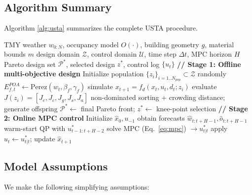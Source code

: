 \documentclass[5p,times,twocolumn]{elsarticle}
\begin{document}
\subsection{Algorithm Summary}

Algorithm \ref{alg:usta} summarizes the complete USTA procedure.

\begin{algorithm}[!t]
\caption{USTA Hierarchical Design-Control Pipeline}
\label{alg:usta}
\small
\begin{algorithmic}[1]
\REQUIRE TMY weather $w_{0:N}$, occupancy model $O(\cdot)$, building geometry $g$, material bounds $m$
\REQUIRE design domain $\mathcal{Z}$, control domain $\mathcal{U}$, time step $\Delta t$, MPC horizon $H$
\ENSURE Pareto design set $\mathcal{P}^*$, selected design $z^*$, control log $\{u_t\}$
\STATE \textbf{// Stage 1: Offline multi-objective design}
\STATE Initialize population $\{z_i\}_{i=1..N_{pop}} \subset \mathcal{Z}$ randomly
        \STATE $E^{POA}_{f,t} \leftarrow \text{Perez}(w_t, \beta_f, \gamma_f)$ 
        \STATE simulate $x_{t+1} = f_d(x_t, u_t, d_t; z_i)$ 
        \STATE evaluate $J(z_i) = [J_e, J_c, J_g, J_s, J_a]$ 
    \ENDFOR
    \STATE non-dominated sorting + crowding distance; generate offspring
\ENDFOR
\STATE $\mathcal{P}^* \leftarrow$ final Pareto front; $z^* \leftarrow$ knee-point selection
\STATE \textbf{// Stage 2: Online MPC control}
\STATE Initialize $\hat{x}_0, u_{-1}$
    \STATE obtain forecasts $\hat{w}_{t:t+H-1}, \hat{o}_{t:t+H-1}$
    \STATE warm-start QP with $u^*_{t-1:t+H-2}$
    \STATE solve MPC (Eq.~\eqref{eq:mpc}) $\rightarrow u^*_{t|t}$
    \STATE apply $u_t \leftarrow u^*_{t|t}$; update $\hat{x}_{t+1}$
\ENDFOR
\end{algorithmic}
\end{algorithm}

\subsection{Model Assumptions}

We make the following simplifying assumptions:
\end{document}
